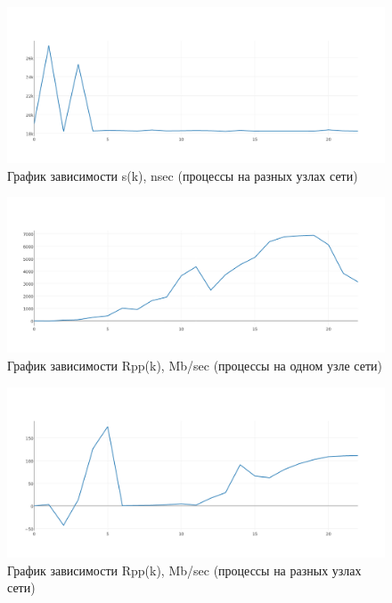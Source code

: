\documentclass[12pt]{article}
\begin{document}
	\begin{figure}[H]
		\centering
		\includegraphics[scale=0.4]{./graphs/lat_ext.png}
		\caption{График зависимости s(k), nsec (процессы на разных узлах сети)}
		\captionsetup{labelformat=empty}
	\end{figure}
	
	\begin{figure}[H]
		\centering
		\includegraphics[scale=0.4]{./graphs/ppcap_int.png}
		\caption{График зависимости Rpp(k), Mb/sec (процессы на одном узле сети)}
		\captionsetup{labelformat=empty}
	\end{figure}
	
	\begin{figure}[H]
		\centering
		\includegraphics[scale=0.4]{./graphs/ppcap_ext.png}
		\caption{График зависимости Rpp(k), Mb/sec (процессы на разных узлах сети)}
		\captionsetup{labelformat=empty}
	\end{figure}
	
\end{document}
